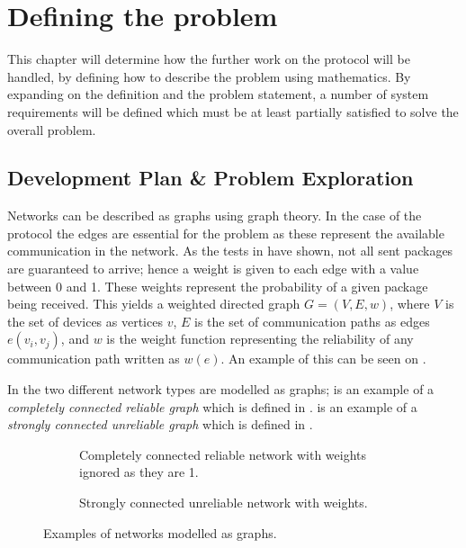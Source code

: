 \chapter{Defining the problem}
This chapter will determine how the further work on the protocol will be handled, by defining how to describe the problem using mathematics. 
By expanding on the definition and the problem statement, a number of system requirements will be defined which must be at least partially satisfied to solve the overall problem.

\section{Development Plan \& Problem Exploration}\label{chp:Problems}
Networks can be described as graphs using graph theory. 
In the case of the protocol the edges are essential for the problem as these represent the available communication in the network.
As the tests in  have shown, not all sent packages are guaranteed to arrive; hence a weight is given to each edge with a value between 0 and 1.
These weights represent the probability of a given package being received.
This yields a weighted directed graph $G = (V, E, w)$, where $V$ is the set of devices as vertices $v$, $E$ is the set of communication paths as edges $e(v_i, v_j)$, and $w$ is the weight function representing the reliability of any communication path written as $w(e)$. 
An example of this can be seen on .

In  the two different network types are modelled as graphs; 
 is an example of a \emph{completely connected reliable graph} which is defined in .
 is an example of a \emph{strongly connected unreliable graph} which is defined in .

\begin{figure}[H]
    \footnotesize
    \begin{subfigure}{0.47\linewidth}
        \centering
        
        \caption{Completely connected reliable network with weights ignored as they are 1.}
        \label{fig:ccrcnetworkgraph}
    \end{subfigure}\hfill
    \begin{subfigure}{0.47\linewidth}
        \centering
        
        \caption{Strongly connected unreliable network with weights.}
        \label{fig:network}
    \end{subfigure}
    \caption{Examples of networks modelled as graphs.}
    \label{fig:examplenetworkgraphs}
    \vspace{-20pt}
\end{figure}

